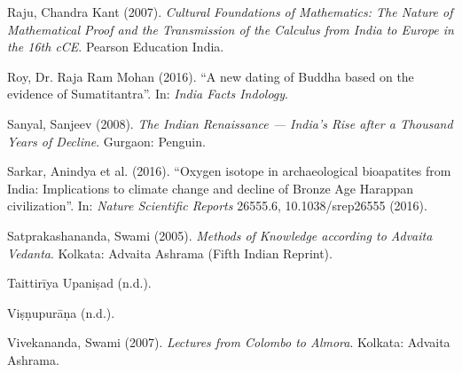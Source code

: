 \begin{thebibliography}{99}
Raju, Chandra Kant (2007). {\sl Cultural Foundations of Mathematics: The Nature of Mathematical Proof and the Transmission of the Calculus from India to Europe in the 16th cCE}. Pearson Education India.

Roy, Dr. Raja Ram Mohan (2016). ``A new dating of Buddha based on the evidence of Sumatitantra''. In: {\sl India Facts Indology}.

Sanyal, Sanjeev (2008). {\sl The Indian Renaissance --- India's Rise after a Thousand Years of Decline}. Gurgaon: Penguin.

Sarkar, Anindya et al. (2016). ``Oxygen isotope in archaeological bioapatites from India: Implications to climate change and decline of Bronze Age Harappan civilization''. In: {\sl Nature Scientific Reports} 26555.6, 10.1038/srep26555 (2016).

Satprakashananda, Swami (2005). {\sl Methods of Knowledge according to Advaita Vedanta}. Kolkata: Advaita Ashrama (Fifth Indian Reprint).

Taittirīya Upaniṣad (n.d.).

Viṣṇupurāṇa (n.d.).

Vivekananda, Swami (2007). {\sl Lectures from Colombo to Almora}. Kolkata: Advaita Ashrama.
\end{thebibliography}


\theendnotes


